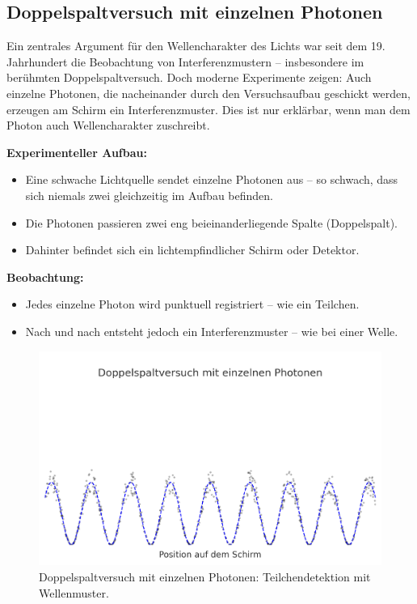 \medskip

\subsection{Doppelspaltversuch mit einzelnen Photonen}

Ein zentrales Argument für den Wellencharakter des Lichts war seit dem 19. Jahrhundert die Beobachtung von Interferenzmustern – insbesondere im berühmten Doppelspaltversuch. Doch moderne Experimente zeigen: Auch einzelne Photonen, die nacheinander durch den Versuchsaufbau geschickt werden, erzeugen am Schirm ein Interferenzmuster. Dies ist nur erklärbar, wenn man dem Photon auch Wellencharakter zuschreibt.

\textbf{Experimenteller Aufbau:}
\begin{itemize}
	\item Eine schwache Lichtquelle sendet einzelne Photonen aus – so schwach, dass sich niemals zwei gleichzeitig im Aufbau befinden.
	\item Die Photonen passieren zwei eng beieinanderliegende Spalte (Doppelspalt).
	\item Dahinter befindet sich ein lichtempfindlicher Schirm oder Detektor.
\end{itemize}

\textbf{Beobachtung:}
\begin{itemize}
	\item Jedes einzelne Photon wird punktuell registriert – wie ein Teilchen.
	\item Nach und nach entsteht jedoch ein Interferenzmuster – wie bei einer Welle.
\end{itemize}

\medskip
\begin{figure}[H]
	\begin{center}
		\includegraphics[width=0.65\linewidth]{bilder/doppelspalt-photonen.png}
	\end{center}
	\caption{Doppelspaltversuch mit einzelnen Photonen: Teilchendetektion mit Wellenmuster.}
\end{figure}

